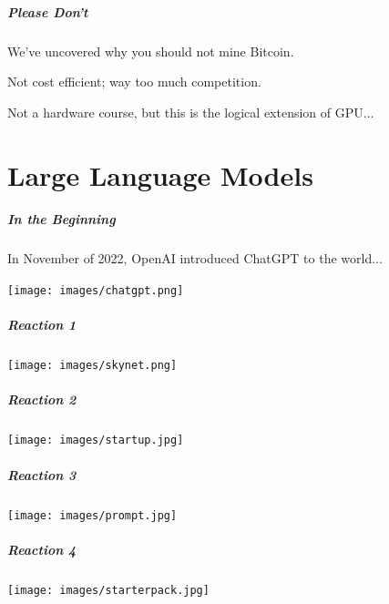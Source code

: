 \begin{frame}
\frametitle{Please Don't}

We've uncovered why you should not mine Bitcoin.

Not cost efficient; way too much competition.

Not a hardware course, but this is the logical extension of GPU...

\end{frame}

\part{Large Language Models}

\begin{frame}
\partpage
\end{frame}

\begin{frame}
\frametitle{In the Beginning}

In November of 2022, OpenAI introduced ChatGPT to the world...

\begin{center}
	\texttt{[image: images/chatgpt.png]}
\end{center}

\end{frame}

\begin{frame}
\frametitle{Reaction 1}

\begin{center}
	\texttt{[image: images/skynet.png]}
\end{center}

\end{frame}

\begin{frame}
\frametitle{Reaction 2}

\begin{center}
	\texttt{[image: images/startup.jpg]}
\end{center}

\end{frame}

\begin{frame}
\frametitle{Reaction 3}

\begin{center}
	\texttt{[image: images/prompt.jpg]}
\end{center}

\end{frame}

\begin{frame}
\frametitle{Reaction 4}

\begin{center}
	\texttt{[image: images/starterpack.jpg]}
\end{center}

\end{frame}


